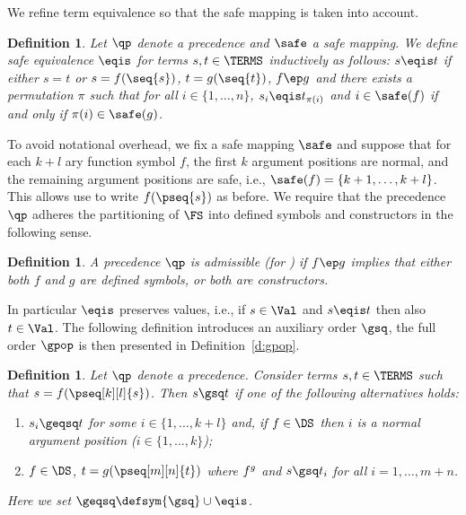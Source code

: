 \documentclass{LMCS}
\newtheorem{definition}[thm]{Definition}
\begin{document}
We refine term equivalence so that the safe mapping is taken into account. 

\begin{definition}\label{d:eqis}
  Let ${\qp}$ denote a precedence and $\safe$ a safe mapping.
  We define \emph{safe equivalence} $\eqis$ for terms $s,t \in \TERMS$
  inductively as follows:
  $s \eqis t$ if either $s = t$ or
  $s = f(\seq{s})$, $t = g(\seq{t})$, $f \ep g$
  and there exists a permutation $\pi$ such that for all $i \in \{1,\dots,n\}$, 
  $s_i \eqis t_{\pi(i)}$ and $i \in \safe(f)$ if and only if $\pi(i) \in \safe(g)$.
\end{definition}

To avoid notational overhead, we fix a safe mapping $\safe$ and suppose that for each $k+l$ ary function symbol 
$f$, the first $k$ argument positions are normal, and the remaining 
argument positions are safe, i.e., $\safe(f) = \{k+1,\dots,k+l\}$.
This allows use to write $f(\pseq{s})$ as before.
We require that the precedence $\qp$ adheres the partitioning of 
$\FS$ into defined symbols and constructors in the following sense.

\begin{definition}
A precedence $\qp$ is \emph{admissible} (for \POPSTAR) if $f \ep g$ implies 
that either both $f$ and $g$ are defined symbols, or both are constructors.
\end{definition}

In particular $\eqis$ preserves values, i.e., 
if $s \in \Val$ and $s \eqis t$ then also $t \in \Val$. 
The following definition introduces an auxiliary order $\gsq$, 
the full order $\gpop$ is then presented in Definition~\ref{d:gpop}.

\begin{definition}\label{d:gsq}
  Let ${\qp}$ denote a precedence.  
  Consider terms $s, t \in \TERMS$ such that $s = f(\pseq[k][l]{s})$.
  Then $s \gsq t$ if one of the following alternatives holds:
  \begin{enumerate}[labelsep=*,leftmargin=*]
  \item\label{d:gsq:st} $s_i \geqsq t$ for some $i \in \{1,\dots,k+l\}$ and, 
    if $f \in \DS$ then $i$ is a normal argument position ($i \in \{1,\dots,k\}$);
  \item\label{d:gsq:ia} $f \in \DS$, $t = g(\pseq[m][n]{t})$ where $f \sp g$ 
    and $s \gsq t_i$ for all $i = 1,\dots,m+n$.
  \end{enumerate}
  Here we set ${\geqsq} \defsym {\gsq} \cup {\eqis}$.
\end{definition}
\end{document}
